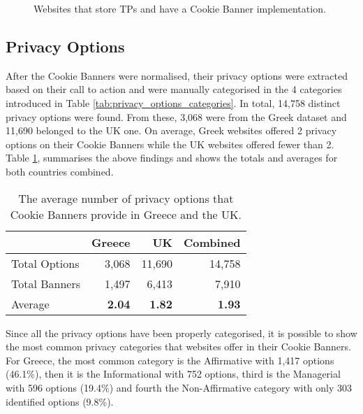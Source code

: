 \documentclass[../main.tex]{subfiles}
\begin{document}
\begin{figure}[ht]
    \centering
    \renewcommand{\bcfontstyle}{}
    \begin{bchart}[step=10,max=80, unit=\%]
        \bigskip
    \end{bchart}
    \caption{Websites that store TPs and have a Cookie Banner implementation.}
    \label{fig:prevalence_cookie_banners_tps}
\end{figure}

\newpage
\subsection{Privacy Options}
After the Cookie Banners were normalised, their privacy options were extracted based on their call to action and were manually categorised in the 4 categories introduced in Table \ref{tab:privacy_options_categories}. In total, 14,758 distinct privacy options were found. From these, 3,068 were from the Greek dataset and 11,690 belonged to the UK one. On average, Greek websites offered 2 privacy options on their Cookie Banners while the UK websites offered fewer than 2. Table \ref{tab:avg_options}, summarises the above findings and shows the totals and averages for both countries combined.

\begin{table}[ht]
    \centering
    \begin{tabular}{@{}lrrr@{}}
        \toprule
                      & Greece         & UK             & Combined          \\ \midrule
        Total Options & 3,068          & 11,690         & 14,758         \\
        Total Banners & 1,497          & 6,413          & 7,910          \\
        Average       & \textbf{2.04}  & \textbf{1.82}  & \textbf{1.93} \\ \bottomrule
    \end{tabular}
    \caption{The average number of privacy options that Cookie Banners provide in Greece and the UK.}
    \label{tab:avg_options}
\end{table}

Since all the privacy options have been properly categorised, it is possible to show the most common privacy categories that websites offer in their Cookie Banners. For Greece, the most common category is the Affirmative with 1,417 options (46.1\%), then it is the Informational with 752 options, third is the Managerial with 596 options (19.4\%) and fourth the Non-Affirmative category with only 303 identified options (9.8\%).
\end{document}
